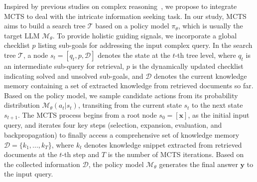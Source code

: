  Inspired by previous studies on complex reasoning~\cite{kang2024mindstar, wang2024q*, jiang2024technical}, we propose to integrate MCTS to deal with the intricate information seeking task. In our study, MCTS aims to build a search tree $\mathcal{T}$ based on a policy model $\pi_{\theta}$, which is usually the target LLM $\mathcal{M}_\theta$. To provide holistic guiding signals, we incorporate a global checklist $p$ listing sub-goals for addressing the input complex query.
In the search tree $\mathcal{T}$, a node $s_t = [q_t, p, \mathcal{D}]$ denotes the state at the $t$-th tree level, where $q_t$ is an intermediate sub-query for retrieval, $p$ is the dynamically updated checklist indicating solved and unsolved sub-goals, and $\mathcal{D}$ denotes the current knowledge memory containing a set of extracted knowledge from retrieved documents so far. Based on the policy model, we sample candidate actions from its probability distribution $\mathcal{M}_\theta(a_t|s_t)$, transiting from the current state $s_t$ to the next state $s_{t+1}$. The MCTS process begins from a root node $s_0=[\bm{x}]$, as the initial input query, and iterates four key steps (\ie selection, expansion, evaluation, and backpropagation) to finally access a comprehensive set of knowledge memory $\mathcal{D} = \{k_1,..., k_T$\}, where $k_t$ denotes knowledge snippet extracted from retrieved documents at the $t$-th step and $T$ is the number of MCTS iterations. Based on the collected information $\mathcal{D}$, the policy model $\mathcal{M}_\theta$ generates the final answer $\bm{y}$ to the input query.


